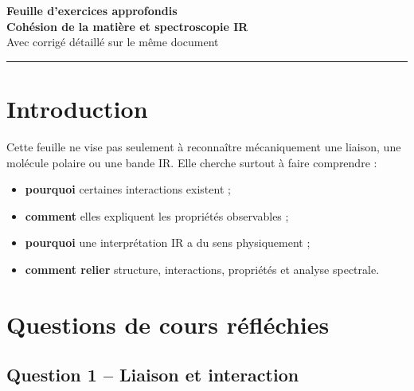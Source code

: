 \documentclass[11pt,a4paper]{article}
\begin{document}
\begin{center}
    {\LARGE \textbf{Feuille d'exercices approfondis}}\\[0.3em]
    {\Large \textbf{Cohésion de la matière et spectroscopie IR}}\\[0.4em]
    {\normalsize Avec corrigé détaillé sur le même document}\\[0.7em]
    \rule{0.9\linewidth}{0.6pt}
\end{center}

\tableofcontents
\vspace{1em}

\section{Introduction}

\begin{objectifbox}
Cette feuille ne vise pas seulement à reconnaître mécaniquement une liaison, une molécule polaire ou une bande IR.  
Elle cherche surtout à faire comprendre :
\begin{itemize}
    \item \textbf{pourquoi} certaines interactions existent ;
    \item \textbf{comment} elles expliquent les propriétés observables ;
    \item \textbf{pourquoi} une interprétation IR a du sens physiquement ;
    \item \textbf{comment relier} structure, interactions, propriétés et analyse spectrale.
\end{itemize}
\end{objectifbox}

\section{Questions de cours réfléchies}

\subsection{Question 1 -- Liaison et interaction}
\end{document}
